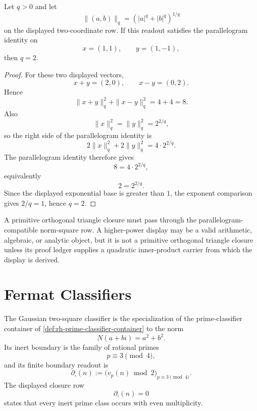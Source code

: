 \begin{theorem}
\label{thm:rh-lq-parallelogram-obstruction}
Let $q>0$ and let
$$
\|(a,b)\|_q=(|a|^q+|b|^q)^{1/q}
$$
on the displayed two-coordinate row.  If this readout satisfies the
parallelogram identity on
$$
x=(1,1),
\qquad
y=(1,-1),
$$
then $q=2$.
\end{theorem}

\begin{proof}
For these two displayed vectors,
$$
x+y=(2,0),
\qquad
x-y=(0,2).
$$
Hence
$$
\|x+y\|_q^2+\|x-y\|_q^2
=
4+4
=
8.
$$
Also
$$
\|x\|_q^2=\|y\|_q^2=2^{2/q},
$$
so the right side of the parallelogram identity is
$$
2\|x\|_q^2+2\|y\|_q^2
=
4\cdot 2^{2/q}.
$$
The parallelogram identity therefore gives
$$
8=4\cdot 2^{2/q},
$$
equivalently
$$
2=2^{2/q}.
$$
Since the displayed exponential base is greater than $1$, the exponent
comparison gives $2/q=1$, hence $q=2$.
\end{proof}

\begin{principle}
\label{prin:rh-quadratic-only-primitive-triangle}
A primitive orthogonal triangle closure must pass through the
parallelogram-compatible norm-square row.  A higher-power display may be a
valid arithmetic, algebraic, or analytic object, but it is not a primitive
orthogonal triangle closure unless its proof ledger supplies a quadratic
inner-product carrier from which the display is derived.
\end{principle}

\section{Fermat Classifiers}
\label{sec:rh-fermat-prototype-fermat-classifiers}

\begin{definition}
\label{def:rh-gaussian-two-square-classifier-row}
The Gaussian two-square classifier is the specialization of the
prime-classifier container of
\autoref{def:rh-prime-classifier-container} to the norm
$$
N(a+bi)=a^2+b^2.
$$
Its inert boundary is the family of rational primes
$$
p\equiv3\pmod4,
$$
and its finite boundary readout is
$$
\partial_{\square}(n)
:=
\bigl(v_p(n)\bmod2\bigr)_{p\equiv3\pmod4}.
$$
The displayed closure row
$$
\partial_{\square}(n)=0
$$
states that every inert prime class occurs with even multiplicity.
\end{definition}

